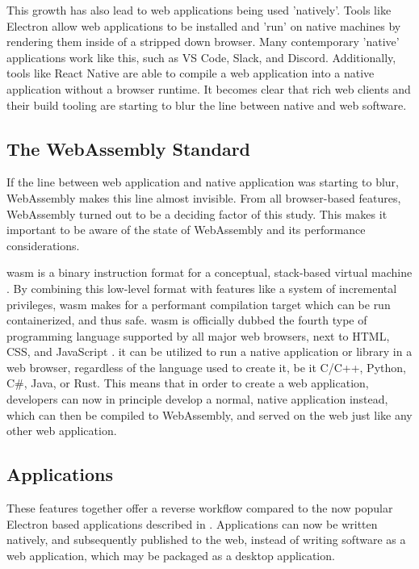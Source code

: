 This growth has also lead to web applications being used 'natively'. 
Tools like Electron \citep{contributors_electron_2022} allow web applications to be installed and 'run' on native machines by rendering them inside of a stripped down browser. 
Many contemporary 'native' applications work like this, such as VS Code, Slack, and Discord.
Additionally, tools like React Native \citep{contributors_react_2022} are able to compile a web application into a native application without a browser runtime.  
It becomes clear that rich web clients and their build tooling are starting to blur the line between native and web software.

\subsection{The WebAssembly Standard}
\label{sec:background-wasm}

If the line between web application and native application was starting to blur, 
WebAssembly makes this line almost invisible. 
From all browser-based features, WebAssembly turned out to be a deciding factor of this study. This makes it important to be aware of the state of WebAssembly and its performance considerations.

\ac{wasm} is a binary instruction format for a conceptual, stack-based virtual machine \citep{contributors_webassembly_2022}.
By combining this low-level format with features like a system of incremental privileges, \ac{wasm} makes for a performant compilation target which can be run containerized, and thus safe.
\ac{wasm} is officially dubbed the fourth type of programming language supported by all major web browsers, next to HTML, CSS, and JavaScript \citep{w3c_world_2019}.
it can be utilized to run a native application or library in a web browser, regardless of the language used to create it, be it C/C++, Python, C\#, Java, or Rust. 
This means that in order to create a web application, developers can now in principle develop a normal, native application instead, which can then be compiled to WebAssembly, and served on the web just like any other web application. 

\subsection*{Applications}

These features together offer a reverse workflow compared to the now popular Electron based applications described in .
Applications can now be written natively, and subsequently published to the web, instead of writing software as a web application, which may be packaged as a desktop application. 

